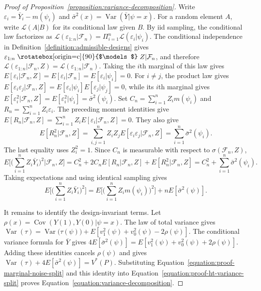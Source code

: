 \documentclass[letterpaper,12pt]{article}
\theoremstyle{definition}
\numberwithin{equation}{section}
\newcommand{\ylevel}{\bar Y}
\newcommand{\yleveli}{\bar Y_i}
\newcommand{\indep}{\mathrel{\raisebox{0.05em}{\rotatebox[origin=c]{90}{$\models$}}}}
\DeclareMathOperator{\var}{Var}
\DeclareMathOperator{\cov}{Cov}
\begin{document}
\begin{proof}[Proof of Proposition~\ref{proposition:variance-decomposition}]
Write $\varepsilon_i=\yleveli-m(\psi_i)$ and $\bar\sigma^2(x)=\var(\ylevel|\psi=x)$.
For a random element $A$, write $\mathcal L(A|B)$ for its conditional law given $B$.
By iid sampling, the conditional law factorizes as $\mathcal L(\varepsilon_{1:n}|\mathcal F_n)=\Pi_{i=1}^n\mathcal L(\varepsilon_i|\psi_i)$.
The conditional independence in Definition~\ref{definition:admissible-designs} gives $\varepsilon_{1:n}\indep Z|\mathcal F_n$, and therefore $\mathcal L(\varepsilon_{1:n}|\mathcal F_n,Z)=\mathcal L(\varepsilon_{1:n}|\mathcal F_n)$.
Taking the $i$th marginal of this law gives $E[\varepsilon_i|\mathcal F_n,Z]=E[\varepsilon_i|\mathcal F_n]=E[\varepsilon_i|\psi_i]=0$.
For $i\neq j$, the product law gives $E[\varepsilon_i\varepsilon_j|\mathcal F_n,Z]=E[\varepsilon_i|\psi_i]E[\varepsilon_j|\psi_j]=0$, while its $i$th marginal gives $E[\varepsilon_i^2|\mathcal F_n,Z]=E[\varepsilon_i^2|\psi_i]=\bar\sigma^2(\psi_i)$.
Set $C_n=\sum_{i=1}^nZ_im(\psi_i)$ and $R_n=\sum_{i=1}^nZ_i\varepsilon_i$.
The preceding moment identities give $E[R_n|\mathcal F_n,Z]=\sum_{i=1}^nZ_iE[\varepsilon_i|\mathcal F_n,Z]=0$.
They also give
\begin{equation*}
E[R_n^2|\mathcal F_n,Z]=\sum_{i,j=1}^nZ_iZ_jE[\varepsilon_i\varepsilon_j|\mathcal F_n,Z]=\sum_{i=1}^n\bar\sigma^2(\psi_i).
\end{equation*}
The last equality uses $Z_i^2=1$.
Since $C_n$ is measurable with respect to $\sigma(\mathcal F_n,Z)$,
\begin{equation*}
E\bigg[\bigg(\sum_{i=1}^nZ_i\yleveli\bigg)^2\bigg|\mathcal F_n,Z\bigg]=C_n^2+2C_nE[R_n|\mathcal F_n,Z]+E[R_n^2|\mathcal F_n,Z]=C_n^2+\sum_{i=1}^n\bar\sigma^2(\psi_i).
\end{equation*}
Taking expectations and using identical sampling gives
\begin{equation}\label{equation:proof-marginal-noise-split}
E\bigg[\bigg(\sum_{i=1}^nZ_i\yleveli\bigg)^2\bigg]=E\bigg[\bigg(\sum_{i=1}^nZ_im(\psi_i)\bigg)^2\bigg]+nE[\bar\sigma^2(\psi)].
\end{equation}

It remains to identify the design-invariant terms.
Let $\rho(x)=\cov(Y(1),Y(0)|\psi=x)$.
The law of total variance gives $\var(\tau)=\var\bigl(\tau(\psi)\bigr)+E[v_1^2(\psi)+v_0^2(\psi)-2\rho(\psi)]$.
The conditional variance formula for $\ylevel$ gives $4E[\bar\sigma^2(\psi)]=E[v_1^2(\psi)+v_0^2(\psi)+2\rho(\psi)]$.
Adding these identities cancels $\rho(\psi)$ and gives $\var(\tau)+4E[\bar\sigma^2(\psi)]=V^*(P)$.
Substituting Equation~\eqref{equation:proof-marginal-noise-split} and this identity into Equation~\eqref{equation:proof-ht-variance-split} proves Equation~\eqref{equation:variance-decomposition}.
\end{proof}
\end{document}
